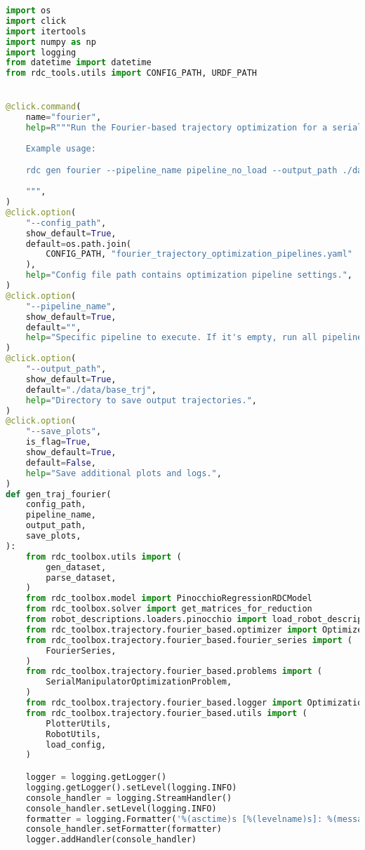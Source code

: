 \begin{lstlisting}[language=python, caption=\raggedright{generation/gen\_trajectory\_fourier.py}, frame=single]
import os
import click
import itertools
import numpy as np
import logging
from datetime import datetime
from rdc_tools.utils import CONFIG_PATH, URDF_PATH


@click.command(
    name="fourier",
    help=R"""Run the Fourier-based trajectory optimization for a serial robot manipulator.
    
    Example usage:

    rdc gen fourier --pipeline_name pipeline_no_load --output_path ./data/base_trj --save_plots
    
    """,
)
@click.option(
    "--config_path",
    show_default=True,
    default=os.path.join(
        CONFIG_PATH, "fourier_trajectory_optimization_pipelines.yaml"
    ),
    help="Config file path contains optimization pipeline settings.",
)
@click.option(
    "--pipeline_name",
    show_default=True,
    default="",
    help="Specific pipeline to execute. If it's empty, run all pipelines.",
)
@click.option(
    "--output_path",
    show_default=True,
    default="./data/base_trj",
    help="Directory to save output trajectories.",
)
@click.option(
    "--save_plots",
    is_flag=True,
    show_default=True,
    default=False,
    help="Save additional plots and logs.",
)
def gen_traj_fourier(
    config_path,
    pipeline_name,
    output_path,
    save_plots,
):
    from rdc_toolbox.utils import (
        gen_dataset,
        parse_dataset,
    )
    from rdc_toolbox.model import PinocchioRegressionRDCModel
    from rdc_toolbox.solver import get_matrices_for_reduction
    from robot_descriptions.loaders.pinocchio import load_robot_description
    from rdc_toolbox.trajectory.fourier_based.optimizer import OptimizerFactory
    from rdc_toolbox.trajectory.fourier_based.fourier_series import (
        FourierSeries,
    )
    from rdc_toolbox.trajectory.fourier_based.problems import (
        SerialManipulatorOptimizationProblem,
    )
    from rdc_toolbox.trajectory.fourier_based.logger import OptimizationLogger
    from rdc_toolbox.trajectory.fourier_based.utils import (
        PlotterUtils,
        RobotUtils,
        load_config,
    )

    logger = logging.getLogger()
    logging.getLogger().setLevel(logging.INFO)
    console_handler = logging.StreamHandler()
    console_handler.setLevel(logging.INFO)
    formatter = logging.Formatter('%(asctime)s [%(levelname)s]: %(message)s')
    console_handler.setFormatter(formatter)
    logger.addHandler(console_handler)



\end{lstlisting}
